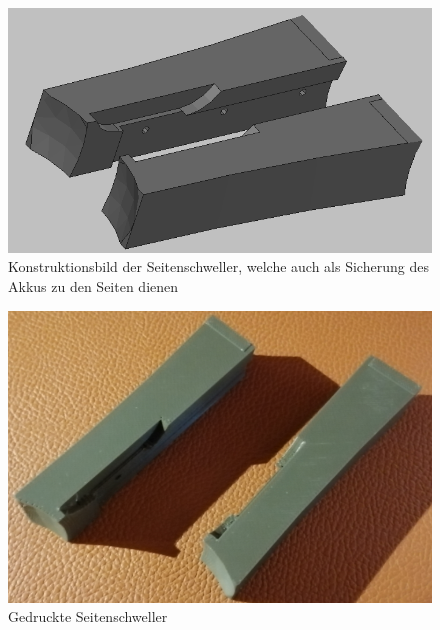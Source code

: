 \begin{minipage}[t]{0.47\textwidth}
\centering
\begin{figure}[H] %
\includegraphics[width=.85\textwidth]{sec2/images/3DAnbaukomponenten/Konstruktionsbilder/SeitenschwellerKonstruktion} 
\centering
\captionsetup{width=.9\textwidth}
\caption[Konstruktionsbild der Seitenschweller]{Konstruktionsbild der Seitenschweller, welche auch als Sicherung des Akkus zu den Seiten dienen}
\centering
\label{fig:SeitenschwellerKonstruktion}
\end{figure}
\end{minipage}
\begin{minipage}[t]{0.47\textwidth}
\begin{figure}[H] %
\includegraphics[width=.85\textwidth]{sec2/images/3DAnbaukomponenten/Druckbilder/SeitenschwellerDruck} 
\centering
\captionsetup{width=.95\textwidth}
\caption[Gedruckte Seitenschweller]{Gedruckte Seitenschweller}\centering
\label{fig:SeitenschwellerDruck}
\end{figure}
\end{minipage}
\vspace{4mm}

